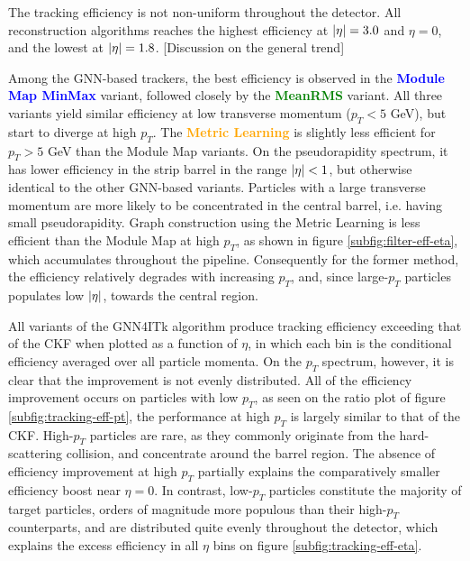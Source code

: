 The tracking efficiency is not non-uniform throughout the detector. 
All reconstruction algorithms reaches the highest efficiency at $\abs{\eta}=3.0$ and $\eta=0$, and the lowest at $\abs{\eta}=1.8$.
[Discussion on the general trend]

Among the GNN-based trackers, the best efficiency is observed in the \textcolor{blue}{\textbf{Module Map MinMax}} variant, followed closely by the \textcolor{green}{\textbf{MeanRMS}} variant.
All three variants yield similar efficiency at low transverse momentum ($p_T<5$ GeV), but start to diverge at high $p_T$.
The \textcolor{orange}{\textbf{Metric Learning}} is slightly less efficient for $p_T > 5$ GeV than the Module Map variants.
On the pseudorapidity spectrum, it has lower efficiency in the strip barrel in the range $\abs{\eta}<1$, but otherwise identical to the other GNN-based variants.
Particles with a large transverse momentum are more likely to be concentrated in the central barrel, i.e. having small pseudorapidity. 
Graph construction using the Metric Learning is less efficient than the Module Map at high $p_T$, as shown in figure \ref{subfig:filter-eff-eta}, which accumulates throughout the pipeline. 
Consequently for the former method, the efficiency relatively degrades with increasing $p_T$, and, since large-$p_T$ particles populates low $\abs{\eta}$, towards the central region.

All variants of the GNN4ITk algorithm produce tracking efficiency exceeding that of the CKF when plotted as a function of $\eta$, in which each bin is the conditional efficiency averaged over all particle momenta. 
On the $p_T$ spectrum, however, it is clear that the improvement is not evenly distributed. 
All of the efficiency improvement occurs on particles with low $p_T$, as seen on the ratio plot of figure \ref{subfig:tracking-eff-pt}, the performance at high $p_T$ is largely similar to that of the CKF.
High-$p_T$ particles are rare, as they commonly originate from the hard-scattering collision, and concentrate around the barrel region.
The absence of efficiency improvement at high $p_T$ partially explains the comparatively smaller efficiency boost near $\eta=0$. 
In contrast, low-$p_T$ particles constitute the majority of target particles, orders of magnitude more populous than their high-$p_T$ counterparts, and are distributed quite evenly throughout the detector, which explains the excess efficiency in all $\eta$ bins on figure \ref{subfig:tracking-eff-eta}. 

